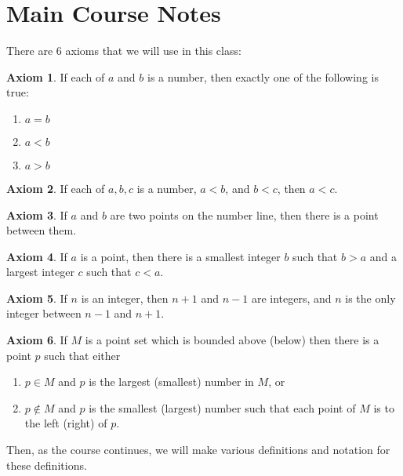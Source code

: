 \documentclass{article}
\theoremstyle{definition}
\newtheorem{axiom}{Axiom}
\begin{document}
\section*{Main Course Notes}
There are 6 axioms that we will use in this class:

\begin{axiom}
If each of $a$ and $b$ is a number, then exactly one of the following is true:
\begin{enumerate}
\item
$a = b$
\item
$a < b$
\item
$a > b$
\end{enumerate}
\end{axiom}

\begin{axiom}
If each of $a, b, c$ is a number, $a < b$, and $b < c$, then $a < c$.
\end{axiom}

\begin{axiom}
If $a$ and $b$ are two points on the number line, then there is a point between them.
\end{axiom}

\begin{axiom}
If $a$ is a point, then there is a smallest integer $b$ such that $b > a$ and a largest integer $c$ such that $c < a$.
\end{axiom}

\begin{axiom}
If $n$ is an integer, then $n + 1$ and $n - 1$ are integers, and $n$ is the only integer between $n - 1$ and $n + 1$.
\end{axiom}

\begin{axiom}
If $M$ is a point set which is bounded above (below) then there is a point $p$ such that either
\begin{enumerate}
\item $p \in M$ and $p$ is the largest (smallest) number in $M$, or

\item $p \notin M$ and $p$ is the smallest (largest) number such that each point of $M$ is to the left (right) of $p$.
\end{enumerate}

\end{axiom}


Then, as the course continues, we will make various definitions and notation for these definitions.
\end{document}
